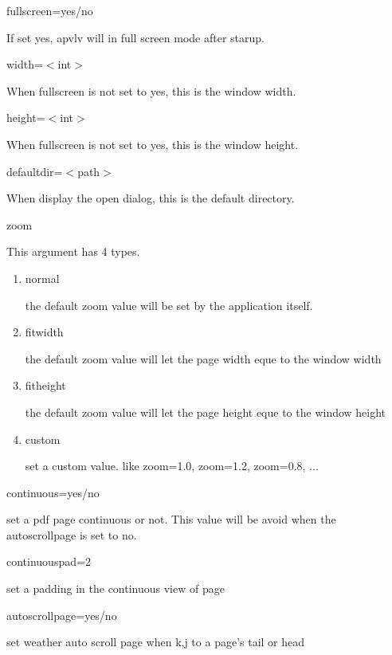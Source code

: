 \documentclass[a4paper,12pt]{article}
\begin{document}
\begin{description}

\item fullscreen=yes/no

If set yes, apvlv will in full screen mode after starup.

\item width=$<$int$>$

When fullscreen is not set to yes, this is the window width.

\item height=$<$int$>$

When fullscreen is not set to yes, this is the window height.

\item defaultdir=$<$path$>$

When display the open dialog, this is the default directory.

\item zoom

This argument has 4 types.

\begin{enumerate}

\item normal

the default zoom value will be set by the application itself.

\item fitwidth

the default zoom value will let the page width eque to the window width

\item fitheight

the default zoom value will let the page height eque to the window height

\item custom

set a custom value. like zoom=1.0, zoom=1.2, zoom=0.8, ...

\end{enumerate}

\item continuous=yes/no

set a pdf page continuous or not. This value will be avoid when the autoscrollpage is set to no.

\item continuouspad=2

set a padding in the continuous view of page

\item autoscrollpage=yes/no

set weather auto scroll page when k,j to a page's tail or head

\end{description}
\end{document}
